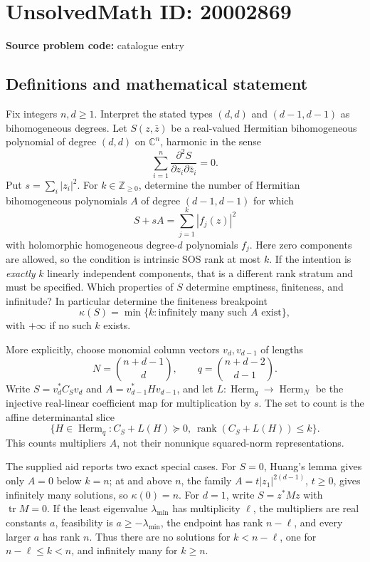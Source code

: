 \documentclass[11pt]{article}
\newcommand{\Z}{\mathbb{Z}}
\newcommand{\C}{\mathbb{C}}
\begin{document}
\section*{UnsolvedMath ID: 20002869}
\textbf{Source problem code:} catalogue entry
\subsection{Definitions and mathematical statement}
Fix integers \(n,d\ge1\). Interpret the stated types \((d,d)\) and \((d-1,d-1)\) as bihomogeneous degrees. Let \(S(z,\bar z)\) be a real-valued Hermitian bihomogeneous polynomial of degree \((d,d)\) on \(\C^n\), harmonic in the sense
\[
\sum_{i=1}^n\frac{\partial^2S}{\partial z_i\partial\bar z_i}=0.
\]
Put \(s=\sum_i|z_i|^2\). For \(k\in\Z_{\ge0}\), determine the number of Hermitian bihomogeneous polynomials \(A\) of degree \((d-1,d-1)\) for which
\[
S+sA=\sum_{j=1}^k|f_j(z)|^2
\]
with holomorphic homogeneous degree-\(d\) polynomials \(f_j\). Here zero components are allowed, so the condition is intrinsic SOS rank at most \(k\). If the intention is \emph{exactly} \(k\) linearly independent components, that is a different rank stratum and must be specified. Which properties of \(S\) determine emptiness, finiteness, and infinitude? In particular determine the finiteness breakpoint
\[
\kappa(S)=\min\{k:\text{infinitely many such }A\text{ exist}\},
\]
with \(+\infty\) if no such \(k\) exists.

More explicitly, choose monomial column vectors \(v_d,v_{d-1}\) of lengths
\[
N=\binom{n+d-1}{d},\qquad q=\binom{n+d-2}{d-1}.
\]
Write \(S=v_d^*C_Sv_d\) and \(A=v_{d-1}^*Hv_{d-1}\), and let \(L:\operatorname{Herm}_q\to\operatorname{Herm}_N\) be the injective real-linear coefficient map for multiplication by \(s\). The set to count is the affine determinantal slice
\[
\{H\in\operatorname{Herm}_q:C_S+L(H)\succeq0,\ \operatorname{rank}(C_S+L(H))\le k\}.
\]
This counts multipliers \(A\), not their nonunique squared-norm representations.

The supplied aid reports two exact special cases. For \(S=0\), Huang's lemma gives only \(A=0\) below \(k=n\); at and above \(n\), the family \(A=t|z_1|^{2(d-1)}\), \(t\ge0\), gives infinitely many solutions, so \(\kappa(0)=n\). For \(d=1\), write \(S=z^*Mz\) with \(\operatorname{tr}M=0\). If the least eigenvalue \(\lambda_{\min}\) has multiplicity \(\ell\), the multipliers are real constants \(a\), feasibility is \(a\ge-\lambda_{\min}\), the endpoint has rank \(n-\ell\), and every larger \(a\) has rank \(n\). Thus there are no solutions for \(k<n-\ell\), one for \(n-\ell\le k<n\), and infinitely many for \(k\ge n\).
\end{document}
